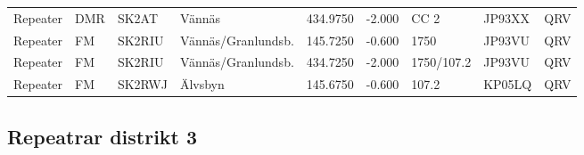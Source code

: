 \begin{landscape}
\begin{longtable}{llllrrlll}
	Repeater & DMR                & SK2AT     & Vännäs               &     434.9750 &     -2.000 & CC 2       & JP93XX      & QRV      \\
	Repeater & FM                 & SK2RIU    & Vännäs/Granlundsb.   &     145.7250 &     -0.600 & 1750       & JP93VU      & QRV      \\
	Repeater & FM                 & SK2RIU    & Vännäs/Granlundsb.   &     434.7250 &     -2.000 & 1750/107.2 & JP93VU      & QRV      \\
	Repeater & FM                 & SK2RWJ    & Älvsbyn              &     145.6750 &     -0.600 & 107.2      & KP05LQ      & QRV     
\end{longtable}


\clearpage

\subsection{Repeatrar distrikt 3}


\end{landscape}
